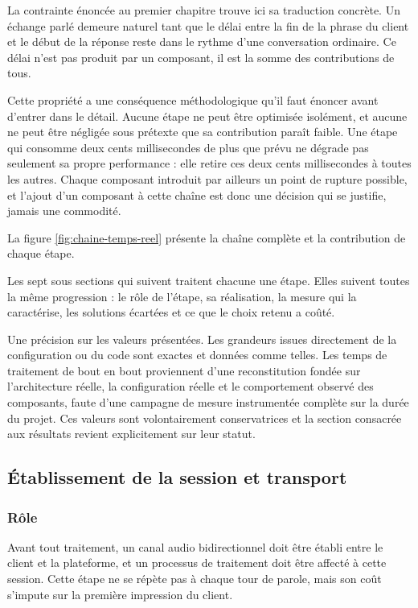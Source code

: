 La contrainte énoncée au premier chapitre trouve ici sa traduction concrète. Un échange parlé demeure naturel tant que le délai entre la fin de la phrase du client et le début de la réponse reste dans le rythme d'une conversation ordinaire. Ce délai n'est pas produit par un composant, il est la somme des contributions de tous.

Cette propriété a une conséquence méthodologique qu'il faut énoncer avant d'entrer dans le détail. Aucune étape ne peut être optimisée isolément, et aucune ne peut être négligée sous prétexte que sa contribution paraît faible. Une étape qui consomme deux cents millisecondes de plus que prévu ne dégrade pas seulement sa propre performance : elle retire ces deux cents millisecondes à toutes les autres. Chaque composant introduit par ailleurs un point de rupture possible, et l'ajout d'un composant à cette chaîne est donc une décision qui se justifie, jamais une commodité.

La figure \ref{fig:chaine-temps-reel} présente la chaîne complète et la contribution de chaque étape.


Les sept sous sections qui suivent traitent chacune une étape. Elles suivent toutes la même progression : le rôle de l'étape, sa réalisation, la mesure qui la caractérise, les solutions écartées et ce que le choix retenu a coûté.

Une précision sur les valeurs présentées. Les grandeurs issues directement de la configuration ou du code sont exactes et données comme telles. Les temps de traitement de bout en bout proviennent d'une reconstitution fondée sur l'architecture réelle, la configuration réelle et le comportement observé des composants, faute d'une campagne de mesure instrumentée complète sur la durée du projet. Ces valeurs sont volontairement conservatrices et la section consacrée aux résultats revient explicitement sur leur statut.

\subsection{Établissement de la session et transport}

\subsubsection{Rôle}

Avant tout traitement, un canal audio bidirectionnel doit être établi entre le client et la plateforme, et un processus de traitement doit être affecté à cette session. Cette étape ne se répète pas à chaque tour de parole, mais son coût s'impute sur la première impression du client.

